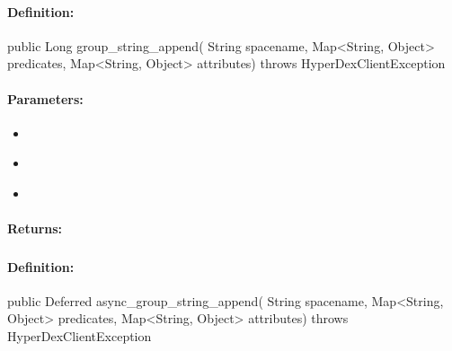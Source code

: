 \paragraph{Definition:}
\begin{javacode}
public Long group_string_append(
        String spacename,
        Map<String, Object> predicates,
        Map<String, Object> attributes) throws HyperDexClientException
\end{javacode}

\paragraph{Parameters:}
\begin{itemize}[noitemsep]
\item {}\\

\item {}\\

\item {}\\

\end{itemize}

\paragraph{Returns:}


\pagebreak
\subsubsection{}
\label{api:java:async_group_string_append}


\paragraph{Definition:}
\begin{javacode}
public Deferred async_group_string_append(
        String spacename,
        Map<String, Object> predicates,
        Map<String, Object> attributes) throws HyperDexClientException
\end{javacode}

